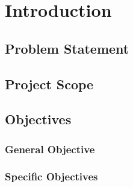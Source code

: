 \chapter{Introduction}


 
\section{Problem Statement}




\section{Project Scope}

\section{Objectives}
\subsection{General Objective}
\subsection{Specific Objectives}
